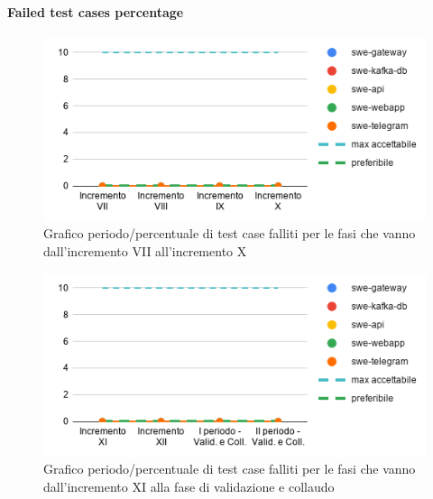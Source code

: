 \paragraph{Failed test cases percentage}
	\begin{figure}[H]
			\centering
			\includegraphics[width=0.8\linewidth]{./res/images/QM-TEST-5-FTCP.png}
			\caption{Grafico periodo/percentuale di test case falliti per le fasi che vanno dall'incremento VII all'incremento X}
			\label{fig:Grafico periodo/percentuale di test case falliti per le fasi che vanno dall'incremento VII all'incremento X}
	\end{figure}
	\begin{figure}[H]
			\centering
			\includegraphics[width=0.8\linewidth]{./res/images/QM-TEST-5-FTCP_1.png}
			\caption{Grafico periodo/percentuale di test case falliti per le fasi che vanno dall'incremento XI alla fase di validazione e collaudo}
			\label{fig:Grafico periodo/percentuale di test case falliti per le fasi che vanno dall'incremento XI alla fase di validazione e collaudo}
	\end{figure}

